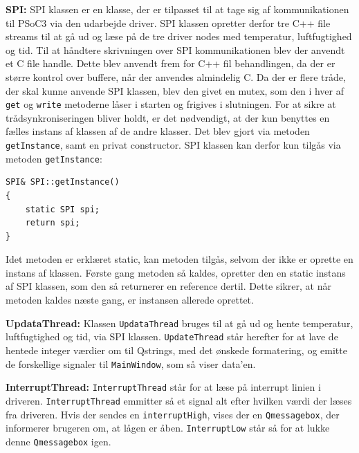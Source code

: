 \textbf{SPI:}
SPI klassen er en klasse, der er tilpasset til at tage sig af kommunikationen til PSoC3 via den udarbejde driver. SPI klassen opretter derfor tre C++ file streams til at gå ud og læse på de tre driver nodes med temperatur, luftfugtighed og tid. Til at håndtere skrivningen over SPI kommunikationen blev der anvendt et C file handle. Dette blev anvendt frem for C++ fil behandlingen, da der er større kontrol over buffere, når der anvendes almindelig C. Da der er flere tråde, der skal kunne anvende SPI klassen, blev den givet en mutex, som den i hver af \texttt{get} og \texttt{write} metoderne låser i starten og frigives i slutningen. For at sikre at trådsynkroniseringen bliver holdt, er det nødvendigt, at der kun benyttes en fælles instans af klassen af de andre klasser. Det blev gjort via metoden \texttt{getInstance}, samt en privat constructor. SPI klassen kan derfor kun tilgås via metoden \texttt{getInstance}:

\begin{lstlisting}
SPI& SPI::getInstance()
{
    static SPI spi;
    return spi;
}
\end{lstlisting}

Idet metoden er erklæret static, kan metoden tilgås, selvom der ikke er oprette en instans af klassen. Første gang metoden så kaldes, opretter den en static instans af SPI klassen, som den så returnerer en reference dertil. Dette sikrer, at når metoden kaldes næste gang, er instansen allerede oprettet.

\textbf{UpdataThread:}
Klassen \texttt{UpdataThread} bruges til at gå ud og hente temperatur, luftfugtighed og tid, via SPI klassen. \texttt{UpdateThread} står herefter for at lave de hentede integer værdier om til Qstrings, med det ønskede formatering, og emitte de forskellige signaler til \texttt{MainWindow}, som så viser data'en.

\textbf{InterruptThread:}
\texttt{InterruptThread} står for at læse på interrupt linien i driveren. \texttt{InterruptThread} emmitter så et signal alt efter hvilken værdi der læses fra driveren. Hvis der sendes en \texttt{interruptHigh}, vises der en \texttt{Qmessagebox}, der informerer brugeren om, at lågen er åben. \texttt{InterruptLow} står så for at lukke denne \texttt{Qmessagebox} igen. 
